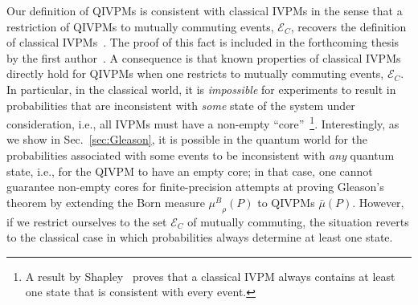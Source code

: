 \documentclass[english,reprint, aps, prl,superscriptaddress, showpacs,
showkeys, longbibliography, amsmath, amssymb, floatfix]{revtex4-1}
\theoremstyle{plain}
\theoremstyle{definition}
\newcommand{\events}{\ensuremath{\mathcal{E}}}
\newcommand{\muB}{\ensuremath{\mu^{B}}}
\newcommand{\eventsC}{\ensuremath{\events_{C}}}
\begin{document}
Our definition of QIVPMs is consistent with classical IVPMs in the
sense that a restriction of QIVPMs to mutually commuting events,
$\eventsC$, recovers the definition of classical
IVPMs~\cite{JamisonLodwick2004}. The proof of this fact is included in the
forthcoming thesis by the first author~\cite{TaiThesis2018}. A
consequence is that known properties of classical IVPMs
directly hold for QIVPMs when one restricts to mutually commuting
events, $\eventsC$. In particular, in the classical world, it is
\emph{impossible} for experiments to result in probabilities that are
inconsistent with \emph{some} state of the system under consideration,
i.e., all IVPMs must have a non-empty ``core''~\footnote{A result by
  Shapley~\cite{Shapley1971,GilboaSchmeidler1994,NgMoYeh1997,Grabisch2016}
  proves that a classical IVPM always contains at least one state that
  is consistent with every event.}. Interestingly, as we show in
Sec.~\ref{sec:Gleason}, it is possible in the quantum world for the
probabilities associated with some events to be inconsistent with
\emph{any} quantum state, i.e., for the QIVPM to have an empty core;
in that case, one cannot guarantee non-empty cores for finite-precision
attempts at proving Gleason's theorem by extending the Born measure
$\muB_{\rho}\left(P\right)$ to QIVPMs
$\bar{\mu}\left(P\right)$. However, if we restrict ourselves to the set
$\eventsC$ of mutually
commuting, the situation reverts to the classical case in which
probabilities always determine at least one state.
\end{document}
